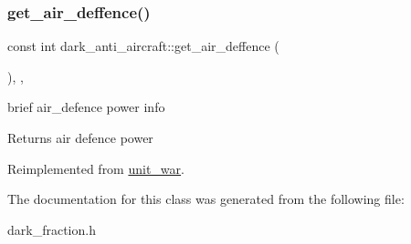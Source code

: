 \subsubsection{\texorpdfstring{get\+\_\+air\+\_\+deffence()}{get\_air\_deffence()}}
{\footnotesize\ttfamily const int dark\+\_\+anti\+\_\+aircraft\+::get\+\_\+air\+\_\+deffence (\begin{DoxyParamCaption}{ }\end{DoxyParamCaption})\hspace{0.3cm}{\ttfamily [inline]}, {\ttfamily [override]}, {\ttfamily [virtual]}}

brief air\+\_\+defence power info \begin{DoxyReturn}{Returns}
air defence power 
\end{DoxyReturn}


Reimplemented from \mbox{\hyperlink{classunit__war_af26f2da420a828230a329339bc9ef805}{unit\+\_\+war}}.



The documentation for this class was generated from the following file\+:\begin{DoxyCompactItemize}
\item 
dark\+\_\+fraction.\+h\end{DoxyCompactItemize}
